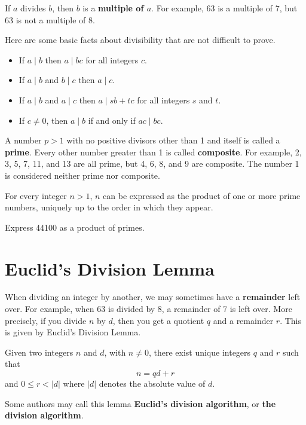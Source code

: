 If $a$ divides $b$, then $b$ is a \textbf{multiple of $a$}. For example, 63 is a multiple of 7, but 63 is not a multiple of 8.

Here are some basic facts about divisibility that are not difficult to prove.
\begin{itemize}
    \item If $a\;|\;b$ then $a\;|\;bc$ for all integers $c$.
    \item If $a\;|\;b$ and $b\;|\;c$ then $a\;|\;c$.
    \item If $a\;|\;b$ and $a\;|\;c$ then $a\;|\;sb+tc$ for all integers $s$ and $t$.
    \item If $c \neq 0$, then $a\;|\;b$ if and only if $ac\;|\;bc$.
\end{itemize}

A number $p > 1$ with no positive divisors other than 1 and itself is called a \textbf{prime}. Every other number greater than 1 is called \textbf{composite}. For example, 2, 3, 5, 7, 11, and 13 are all prime, but 4, 6, 8, and 9 are composite. The number 1 is considered neither prime nor composite.

\begin{theorem}\label{thrm-fundamental-theorem-of-arithmetic}
    For every integer $n > 1$, $n$ can be expressed as the product of one or more prime numbers, uniquely up to the order in which they appear.
\end{theorem}

\begin{exercise}
    Express 44100 as a product of primes.
\end{exercise}

\section{Euclid's Division Lemma}
When dividing an integer by another, we may sometimes have a \textbf{remainder} left over. For example, when 63 is divided by 8, a remainder of 7 is left over. More precisely, if you divide $n$ by $d$, then you get a quotient $q$ and a remainder $r$. This is given by Euclid's Division Lemma.
\begin{lemma}\label{lemma-euclid-division}
    Given two integers $n$ and $d$, with $n \neq 0$, there exist unique integers $q$ and $r$ such that
    \[
        n = qd + r
    \]
    and $0 \leq r < |d|$ where $|d|$ denotes the absolute value of $d$.
\end{lemma}
\begin{remark}
    Some authors may call this lemma \textbf{Euclid's division algorithm}, or \textbf{the division algorithm}.
\end{remark}

